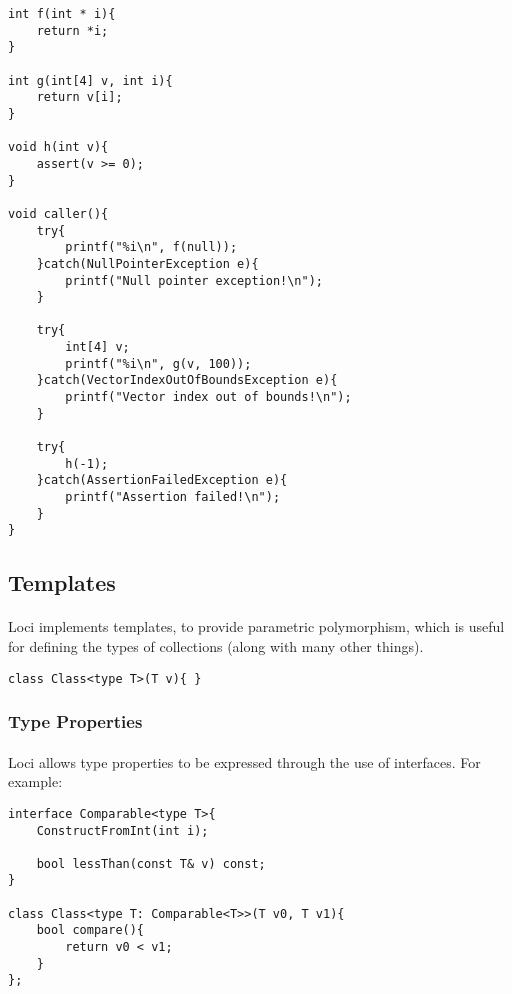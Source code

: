 \documentclass[12pt,twoside,notitlepage]{report}
\begin{document}
\small{
\begin{verbatim}
int f(int * i){
    return *i;
}

int g(int[4] v, int i){
    return v[i];
}

void h(int v){
    assert(v >= 0);
}

void caller(){
    try{
        printf("%i\n", f(null));
    }catch(NullPointerException e){
        printf("Null pointer exception!\n");
    }
    
    try{
        int[4] v;
        printf("%i\n", g(v, 100));
    }catch(VectorIndexOutOfBoundsException e){
        printf("Vector index out of bounds!\n");
    }
    
    try{
        h(-1);
    }catch(AssertionFailedException e){
        printf("Assertion failed!\n");
    }
}
\end{verbatim}
}

\subsection{Templates}

\paragraph{}
Loci implements templates, to provide parametric polymorphism, which is useful for defining the types of collections (along with many other things).

\small{
\begin{verbatim}
class Class<type T>(T v){ }
\end{verbatim}
}

\subsubsection{Type Properties}

\paragraph{}
Loci allows type properties to be expressed through the use of interfaces. For example:

\small{
\begin{verbatim}
interface Comparable<type T>{
    ConstructFromInt(int i);

    bool lessThan(const T& v) const;
}

class Class<type T: Comparable<T>>(T v0, T v1){
    bool compare(){
        return v0 < v1;
    }
};
\end{verbatim}
}
\end{document}
